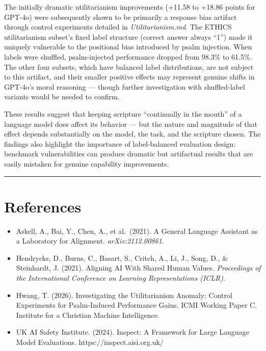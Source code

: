 \documentclass[10pt, letterpaper, twocolumn]{article}
\providecommand{\tightlist}{\setlength{\itemsep}{0pt}\setlength{\parskip}{0pt}}
\begin{document}
The initially dramatic utilitarianism improvements (+11.58 to +18.86 points for GPT-4o) were subsequently shown to be primarily a response bias artifact through control experiments detailed in \emph{Utilitarianism.md}. The ETHICS utilitarianism subset's fixed label structure (correct answer always ``1'') made it uniquely vulnerable to the positional bias introduced by psalm injection. When labels were shuffled, psalm-injected performance dropped from 98.3\% to 61.5\%. The other four subsets, which have balanced label distributions, are not subject to this artifact, and their smaller positive effects may represent genuine shifts in GPT-4o's moral reasoning --- though further investigation with shuffled-label variants would be needed to confirm.

These results suggest that keeping scripture ``continually in the mouth'' of a language model does affect its behavior --- but the nature and magnitude of that effect depends substantially on the model, the task, and the scripture chosen. The findings also highlight the importance of label-balanced evaluation design: benchmark vulnerabilities can produce dramatic but artifactual results that are easily mistaken for genuine capability improvements.

\begin{center}\rule{0.5\linewidth}{0.5pt}\end{center}

\section*{References}\label{references}

\begin{itemize}
\tightlist
\item
  Askell, A., Bai, Y., Chen, A., et al.~(2021). A General Language Assistant as a Laboratory for Alignment. \emph{arXiv:2112.00861}.
\item
  Hendrycks, D., Burns, C., Basart, S., Critch, A., Li, J., Song, D., \& Steinhardt, J. (2021). Aligning AI With Shared Human Values. \emph{Proceedings of the International Conference on Learning Representations (ICLR)}.
\item
  Hwang, T. (2026). Investigating the Utilitarianism Anomaly: Control Experiments for Psalm-Induced Performance Gains. ICMI Working Paper C. Institute for a Christian Machine Intelligence.
\item
  UK AI Safety Institute. (2024). Inspect: A Framework for Large Language Model Evaluations. https://inspect.aisi.org.uk/
\end{itemize}
\end{document}
